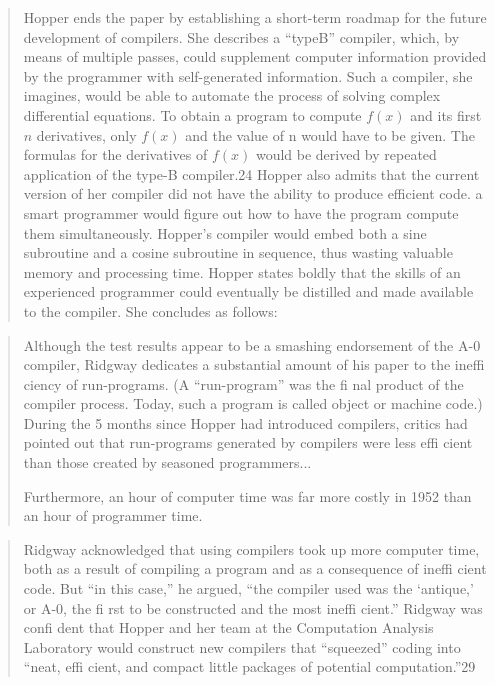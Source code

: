 \begin{quotation}
Hopper ends the paper by establishing a short-term roadmap
for the future development of compilers. She describes a “typeB” compiler, which, by means of multiple passes, could supplement computer information provided by the programmer with
self-generated information. Such a compiler, she imagines, would
be able to automate the process of solving complex differential
equations. To obtain a program to compute $f(x)$ and its first $n$
derivatives, only $f(x)$ and the value of n would have to be given.
The formulas for the derivatives of $f(x)$ would be derived by
repeated application of the type-B compiler.24
Hopper also admits that the current version of her compiler
did not have the ability to produce efficient code. 
a smart programmer would figure out how to have the program 
compute them simultaneously. Hopper's compiler would embed both
a sine subroutine and a cosine subroutine in sequence, thus
wasting valuable memory and processing time. Hopper states
boldly that the skills of an experienced programmer could eventually be distilled and made available to the compiler. She concludes as follows:
\end{quotation}

\begin{quotation}
Although the test results appear to be a smashing endorsement
of the A-0 compiler, Ridgway dedicates a substantial amount of
his paper to the ineffi ciency of run-programs. (A “run-program”
was the fi nal product of the compiler process. Today, such a
program is called object or machine code.) During the 5 months
since Hopper had introduced compilers, critics had pointed out
that run-programs generated by compilers were less effi cient than
those created by seasoned programmers... 

Furthermore, an hour of computer time was far more costly in 1952 than an hour of programmer time. 
\end{quotation}

\begin{quotation}
Ridgway acknowledged that using compilers took up more
computer time, both as a result of compiling a program and as
a consequence of ineffi cient code. But “in this case,” he argued,
“the compiler used was the ‘antique,’ or A-0, the fi rst to be
constructed and the most ineffi cient.” Ridgway was confi dent
that Hopper and her team at the Computation Analysis Laboratory would construct new compilers that “squeezed” coding
into “neat, effi cient, and compact little packages of potential
computation.”29
\end{quotation}

